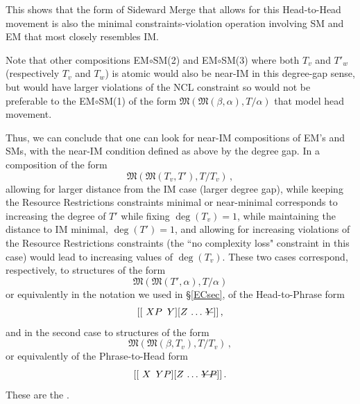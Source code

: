 \documentclass[12pt]{amsart}
\numberwithin{equation}{section}
\def\fM{{\mathfrak M}}
\begin{document}
This shows that the form of Sideward Merge that allows for this Head-to-Head movement
is also the minimal constraints-violation operation involving SM and EM that
most closely resembles IM. 

Note that other compositions EM$\circ$SM(2) and EM$\circ$SM(3) where
both $T_v$ and $T'_w$ (respectively $T_v$ and $T_w$) is atomic would
also be near-IM in this degree-gap sense, but would have larger violations
of the NCL constraint so would not be preferable to
the EM$\circ$SM(1) of the form $\fM( \fM(\beta, \alpha), T/\alpha )$ that
model head movement. 
          
\smallskip          
      
Thus, we can conclude that one can look for near-IM compositions of
EM's and SMs, with the near-IM condition defined as above by the
degree gap. In a composition of the form
\begin{equation}\label{EMSMmin}
 \fM(\fM(T_v,T'),T/T_v)\, , 
\end{equation} 
allowing for larger distance from the IM case (larger
degree gap), while keeping the Resource
Restrictions constraints minimal or near-minimal 
corresponds to increasing the degree of $T'$ while fixing
$\deg(T_v)=1$, while maintaining the distance to IM minimal, $\deg(T')=1$,
and allowing for increasing violations of the Resource
Restrictions constraints (the ``no complexity loss" constraint
in this case) would lead to increasing values of $\deg(T_v)$.
These two cases correspond, respectively, to structures of
the form 
$$ \fM(\fM(T',\alpha), T/\alpha) $$
or equivalently in the notation we used in \S \ref{ECsec}, of the Head-to-Phrase form
$$ [ [ \,\, XP\,\,\,Y] [ Z\, \ldots\,  \text{\sout{$Y$}} ] ] \, , $$
and in the second case to structures of the form
$$ \fM(\fM(\beta, T_v), T/T_v)\, , $$
or equivalently of the Phrase-to-Head form
$$ [ [ \,\, X\,\,\, YP ] [ Z\, \ldots\,  \text{\sout{$YP$}} ] ] \, . $$
These are the .

\smallskip
\end{document}
